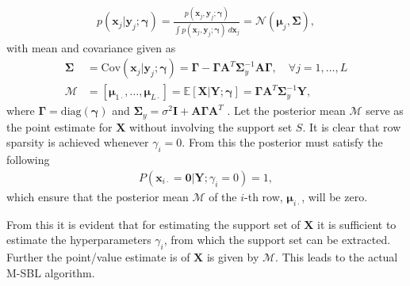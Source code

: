 \begin{align*}
p(\mathbf{x}_{j} \vert \mathbf{y}_{j} ; \boldsymbol{\gamma}) = \frac{p(\mathbf{x}_{j}, \mathbf{y}_{j} ; \boldsymbol{\gamma})}{\int p(\mathbf{x}_{j}, \mathbf{y}_{j} ; \boldsymbol{\gamma}) \ d \mathbf{x}_{j}} = \mathcal{N}(\boldsymbol{\mu}_{j}, \boldsymbol{\Sigma}),
\end{align*}
with mean and covariance given as
\begin{align}
\boldsymbol{\Sigma} &= \text{Cov}(\mathbf{x}_{j} \vert \mathbf{y}_{j} ; \boldsymbol{\gamma}) = \boldsymbol{\Gamma} - \boldsymbol{\Gamma} \mathbf{A}^T \boldsymbol{\Sigma}_y^{-1} \mathbf{A} \boldsymbol{\Gamma}, \quad \forall j = 1, \dots, L \nonumber \\
\mathcal{M} &= [\boldsymbol{\mu}_{1 \cdot}, \dots, \boldsymbol{\mu}_{ L \cdot}] = \mathbb{E}[\mathbf{X} \vert \mathbf{Y} ; \boldsymbol{\gamma}] = \boldsymbol{\Gamma} \mathbf{A}^T \boldsymbol{\Sigma}_y^{-1} \mathbf{Y}, \label{eq:moments}
\end{align}
where $\boldsymbol{\Gamma} = \text{diag}(\boldsymbol{\gamma})$ and $\boldsymbol{\Sigma}_y = \sigma^2 \mathbf{I} + \mathbf{A} \boldsymbol{\Gamma} \mathbf{A}^T$ . 
Let the posterior mean $\mathcal{M}$ serve as the point estimate for $\mathbf{X}$ without involving the support set $S$.
It is clear that row sparsity is achieved whenever $\gamma_i = 0$. 
From this the posterior must satisfy the following 
\begin{align*}
P(\mathbf{x}_{i \cdot} = \mathbf{0} \vert \mathbf{Y} ; \gamma_i = 0) = 1,
\end{align*}
which ensure that the posterior mean $\mathcal{M}$ of the $i$-th row, $\boldsymbol{\mu}_{i \cdot}$, will be zero.

From this it is evident that for estimating the support set of $\textbf{X}$ it is sufficient to estimate the hyperparameters $\gamma_i$, from which the support set can be extracted. Further the point/value estimate is of $\textbf{X}$ is given by $\mathcal{M}$\cite[p. 147/21?]{phd_wipf}. 
This leads to the actual M-SBL algorithm.


